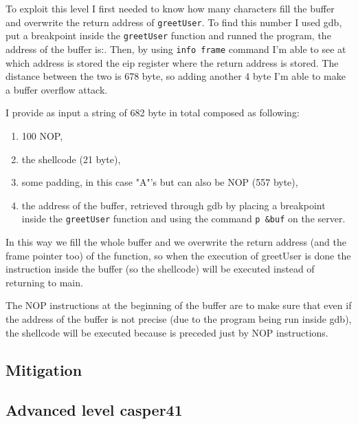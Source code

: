 \documentclass[a4paper,12pt]{article}
\begin{document}
To exploit this level I first needed to know how many characters fill the buffer and overwrite the return address of \texttt{greetUser}. To find this number I used gdb, put a breakpoint inside the \texttt{greetUser} function and runned the program, the address of the buffer is:. Then, by using \texttt{info frame} command I'm able to see at which address is stored the eip register where the return address is stored. The distance between the two is 678 byte, so adding another 4 byte I'm able to make a buffer overflow attack.

I provide as input a string of 682 byte in total composed as following:
\begin{enumerate}
\item 100 NOP,
\item the shellcode (21 byte),
\item some padding, in this case "A"'s but can also be NOP (557 byte),
\item the address of the buffer, retrieved through gdb by placing a breakpoint inside the \texttt{greetUser} function and using the command \texttt{p \&buf} on the server.
\end{enumerate}


In this way we fill the whole buffer and we overwrite the return address (and the frame pointer too) of the function, so when the execution of greetUser is done the instruction inside the buffer (so the shellcode) will be executed instead of returning to main. 

The NOP instructions at the beginning of the buffer are to make sure that even if the address of the buffer is not precise (due to the program being run inside gdb), the shellcode will be executed because is preceded just by NOP instructions.


\subsection{Mitigation}

\subsection{Advanced level casper41}
\end{document}
